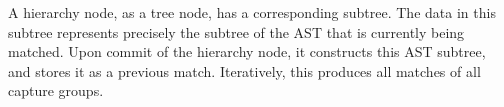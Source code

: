 \documentclass[english]{sigplanconf}
\begin{document}
A hierarchy node, as a tree node, has a corresponding subtree. The
data in this subtree represents precisely the subtree of the AST that
is currently being matched. Upon commit of the hierarchy node, it
constructs this AST subtree, and stores it as a previous match. Iteratively,
this produces all matches of all capture groups.

\end{document}
